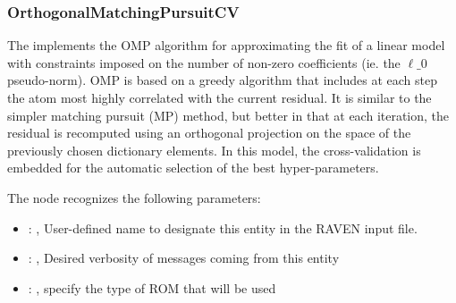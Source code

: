 \subsubsection{OrthogonalMatchingPursuitCV}
  The                          implements the OMP algorithm for
  approximating the fit of a                         linear model with constraints imposed on the
  number of non-zero                         coefficients (ie. the $\ell\_0$ pseudo-norm). OMP is
  based on a greedy                         algorithm that includes at each step the atom most
  highly correlated                         with the current residual. It is similar to the simpler
  matching                         pursuit (MP) method, but better in that at each iteration, the
  residual                         is recomputed using an orthogonal projection on the space of the
  previously chosen dictionary elements.                         In this model, the cross-validation
  is embedded for the automatic selection                         of the best hyper-parameters.

  The  node recognizes the following parameters:
    \begin{itemize}
      \item {}: , 
        User-defined name to designate this entity in the RAVEN input file.
      \item {}: , 
        Desired verbosity of messages coming from this entity
      \item {}: , 
        specify the type of ROM that will be used
  \end{itemize}

